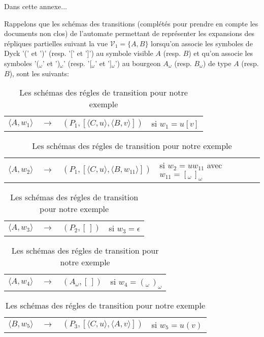 \label{annexeFusions}
\mySaveMarks
Dans cette annexe...

Rappelons que les schémas des transitions (complétés pour prendre en compte les documents non clos) de l'automate permettant de représenter les expansions des répliques partielles suivant la vue $\mathcal{V}_1 = \{A,B\}$ lorsqu'on associe les symboles de Dyck '(' et ')' (resp. '[' et ']') au symbole visible $A$ (resp. $B$) et qu'on associe les symboles '($_{\omega}$' et ')$_{\omega}$' (resp. '[$_{\omega}$' et ']$_{\omega}$') au bourgeon $A_{\omega}$ (resp. $B_{\omega}$) de type $A$ (resp. $B$), sont les suivants:

\begin{table}
	\caption{Les schémas des régles de transition pour notre exemple}
	\begin{flushleft}
	\begin{tabular}[t]{lcp{5.3cm}l}
	$\langle A,w_{1} \rangle$ & $\longrightarrow$ & $(P_{1}, [\langle C,u \rangle, \langle B,v \rangle])$ & si $w_{1}=u[v]$ \\
	
	\end{tabular}
	\begin{tabular}[t]{lcp{5.3cm}l}
	
	$\langle A,w_{2} \rangle$ & $\longrightarrow$ & $(P_{1}, [\langle C,u \rangle, \langle B,w_{11} \rangle])$ & si $w_{2}=uw_{11}$ avec $w_{11}=[_{\omega}\, ]_{\omega}$ \\
	
	\end{tabular}
	\begin{tabular}[t]{lcp{5.3cm}l}
	
	$\langle A,w_{3} \rangle$ & $\longrightarrow$ & $(P_{2}, [\,])$ & si $w_{3}=\epsilon$\\
	
	\end{tabular}
	\begin{tabular}[t]{lcp{5.3cm}l}
	
	$\langle A,w_{4} \rangle$ & $\longrightarrow$ & $(A_{\omega}, [\,])$ & si $w_{4}=(_{\omega}\, )_{\omega}$\\
	
	\end{tabular}
	\begin{tabular}[t]{lcp{5.3cm}l}
	
	$\langle B,w_{5} \rangle$ & $\longrightarrow$ & $(P_{3}, [\langle C,u \rangle, \langle A,v \rangle])$ & si $w_{5}=u(v)$ \\
	

\end{tabular}
\end{flushleft}
\end{table}
